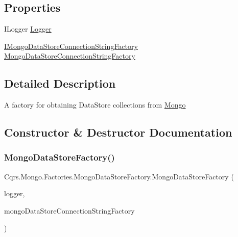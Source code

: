\subsection*{Properties}
\begin{DoxyCompactItemize}
\item 
I\+Logger \hyperlink{classCqrs_1_1Mongo_1_1Factories_1_1MongoDataStoreFactory_a52df9c093f6c5a5666b27833334b48dc_a52df9c093f6c5a5666b27833334b48dc}{Logger}
\item 
\hyperlink{interfaceCqrs_1_1Mongo_1_1Factories_1_1IMongoDataStoreConnectionStringFactory}{I\+Mongo\+Data\+Store\+Connection\+String\+Factory} \hyperlink{classCqrs_1_1Mongo_1_1Factories_1_1MongoDataStoreFactory_a2a93f0c1223ac3eaf3228307ee2849e8_a2a93f0c1223ac3eaf3228307ee2849e8}{Mongo\+Data\+Store\+Connection\+String\+Factory}
\end{DoxyCompactItemize}


\subsection{Detailed Description}
A factory for obtaining Data\+Store collections from \hyperlink{namespaceCqrs_1_1Mongo}{Mongo} 



\subsection{Constructor \& Destructor Documentation}
\mbox{\label{classCqrs_1_1Mongo_1_1Factories_1_1MongoDataStoreFactory_a13e1957d50ef5ebb18723a3628a0ae5d_a13e1957d50ef5ebb18723a3628a0ae5d}} 
\subsubsection{\texorpdfstring{Mongo\+Data\+Store\+Factory()}{MongoDataStoreFactory()}}
{\footnotesize\ttfamily Cqrs.\+Mongo.\+Factories.\+Mongo\+Data\+Store\+Factory.\+Mongo\+Data\+Store\+Factory (\begin{DoxyParamCaption}\item[{I\+Logger}]{logger,  }\item[{\hyperlink{interfaceCqrs_1_1Mongo_1_1Factories_1_1IMongoDataStoreConnectionStringFactory}{I\+Mongo\+Data\+Store\+Connection\+String\+Factory}}]{mongo\+Data\+Store\+Connection\+String\+Factory }\end{DoxyParamCaption})}



